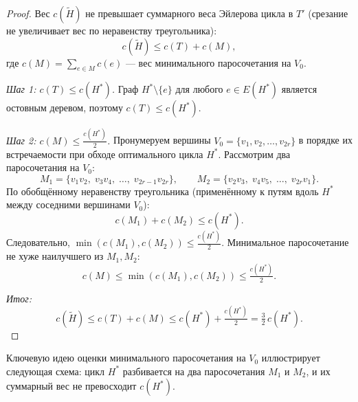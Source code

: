 \begin{proof}
	Вес $c(\widetilde{H})$ не превышает суммарного веса Эйлерова цикла в $T'$ (срезание не увеличивает вес по неравенству треугольника):
	\[
	c(\widetilde{H}) \leq c(T) + c(M),
	\]
	где $c(M) = \sum_{e \in M} c(e)$ --- вес минимального паросочетания на $V_0$.
	
	\emph{Шаг 1: $c(T) \leq c(H^*)$.} Граф $H^* \setminus \{e\}$ для любого $e \in E(H^*)$ является остовным деревом, поэтому $c(T) \leq c(H^*)$.
	
	\emph{Шаг 2: $c(M) \leq \tfrac{c(H^*)}{2}$.} Пронумеруем вершины $V_0 = \{v_1, v_2, \ldots, v_{2r}\}$ в порядке их встречаемости при обходе оптимального цикла $H^*$. Рассмотрим два паросочетания на $V_0$:
	\[
	M_1 = \{v_1v_2,\; v_3v_4,\; \ldots,\; v_{2r-1}v_{2r}\}, \qquad
	M_2 = \{v_2v_3,\; v_4v_5,\; \ldots,\; v_{2r}v_1\}.
	\]
	По обобщённому неравенству треугольника (применённому к путям вдоль $H^*$ между соседними вершинами $V_0$):
	\[
	c(M_1) + c(M_2) \leq c(H^*).
	\]
	Следовательно, $\min(c(M_1),c(M_2)) \leq \tfrac{c(H^*)}{2}$. Минимальное паросочетание не хуже наилучшего из $M_1, M_2$:
	\[
	c(M) \leq \min(c(M_1),c(M_2)) \leq \tfrac{c(H^*)}{2}.
	\]
	
	\emph{Итог:}
	\[
	c(\widetilde{H}) \leq c(T) + c(M) \leq c(H^*) + \tfrac{c(H^*)}{2} = \tfrac{3}{2}\,c(H^*).
	\]
\end{proof}

Ключевую идею оценки минимального паросочетания на $V_0$ иллюстрирует следующая схема: цикл $H^*$ разбивается на два паросочетания $M_1$ и $M_2$, и их суммарный вес не превосходит $c(H^*)$.

\providecommand{\cloudcycle}[4]{%
	\draw[thick]
	(#1) .. controls ($(#1)+(-0.15,0.65)$) and ($(#2)+(-0.45,0.35)$) .. (#2)
	.. controls ($(#2)+(0.45,0.35)$) and ($(#3)+(0.15,0.55)$) .. (#3)
	.. controls ($(#3)+(0.10,-0.45)$) and ($(#4)+(0.55,0.10)$) .. (#4)
	.. controls ($(#4)+(-0.45,-0.55)$) and ($(#1)+(0.00,-0.55)$) .. (#1);
}

